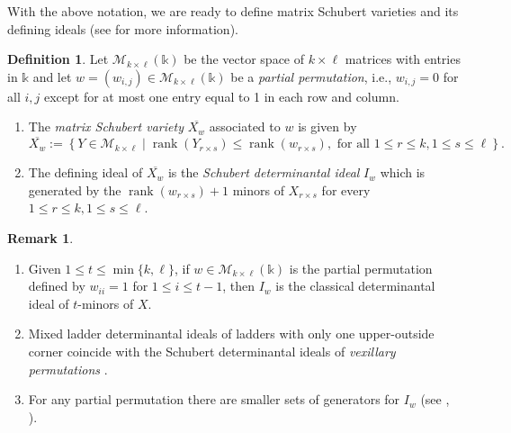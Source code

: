 \documentclass[12pt]{amsart}
\theoremstyle{definition}
\newtheorem{definition}[definition]{Definition}
\newtheorem{remark}[remark]{Remark}
\renewcommand{\(}{\left(}
\renewcommand{\)}{\right)}
\newcommand{\kk}{\mathbb{k}}
\newcommand{\rank}{\operatorname{rank}}
\renewcommand{\!}[1]{{\color{red}\text{\Huge$\star$ }#1}}
\newcommand{\ls}{\leqslant}%
\begin{document}
With the above notation, we are ready to define matrix Schubert varieties and its defining ideals (see \cite[Chapter 15]{MillerSturmfels} for more information).

\begin{definition}\label{def_MSV}
Let $\mathscr{M}_{k\times \ell}(\mathbb{\kk})$ be the vector space of $k\times \ell$ matrices with entries in $\kk$ and let $w=(w_{i,j})\in \mathscr{M}_{k\times \ell}(\mathbb{\kk})$ be a {\it partial permutation}, i.e., $w_{i,j}=0$ for all $i,j$ except for at most one entry equal to 1 in each row and  column.
\begin{enumerate}[(1)]
\item The {\it matrix Schubert variety} $\overline{X_w}$ associated to $w$ is given by 
$$\overline{X_w}:=\left\{Y\in \mathscr{M}_{k\times \ell}\mid \rank(Y_{r\times s})\ls \rank(w_{r\times s}), \text{  for all }1\ls r\ls k, 1\ls s\ls \ell
\right\}.
$$
\item The defining ideal of $\overline{X_w}$ is the {\it Schubert determinantal ideal} $I_w$ which is generated by the $\rank(w_{r\times s})+1$ minors of $X_{r\times s}$ for every $1\ls r\ls k, 1\ls s\ls \ell$.
\end{enumerate}	

\end{definition}

\begin{remark}
	\
	\begin{enumerate}[(1)]
		\item Given $1\ls t\ls \min\{k,\ell\}$, if $w\in \mathscr{M}_{k\times \ell}(\mathbb{\kk})$ is the partial permutation defined by  $w_{ii}=1$ for $1\ls i\ls t-1$, then $I_w$ is the classical determinantal ideal of $t$-minors of $X$. 
			\item 
		Mixed ladder determinantal ideals of  ladders with only one upper-outside corner coincide with the Schubert determinantal ideals of {\it vexillary permutations} \cite[Proposition 9.6]{fulton1992flags}.
		\item For any partial permutation  there are smaller sets of generators for $I_w$ (see \cite[Theorem 15.15]{MillerSturmfels}, \cite{gao2022minimal}).

	   
    \end{enumerate}
\end{remark}
%
%
\end{document}

